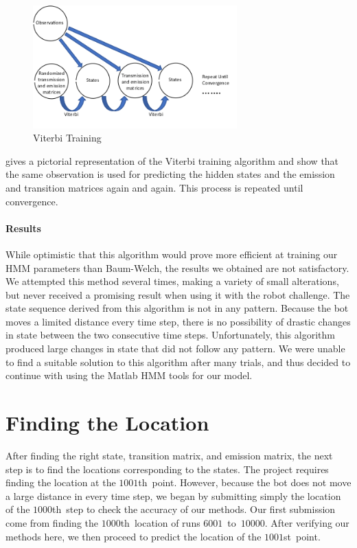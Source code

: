 \documentclass[twoside]{article}
\begin{document}
\begin{figure}[h]
  \centering
  \includegraphics[width=0.7\textwidth]{images/viterbi-training}
  \caption{Viterbi Training}\label{fig:viterbi-training}
\end{figure}

 gives a pictorial representation of the Viterbi training algorithm and show that the same observation is used for predicting the hidden states and the emission and transition matrices again and again.
This process is repeated until convergence.

\paragraph{Results}

While optimistic that this algorithm would prove more efficient at training our HMM parameters than Baum-Welch, the results we obtained are not satisfactory.
We attempted this method several times, making a variety of small alterations, but never received a promising result when using it with the robot challenge.
The state sequence derived from this algorithm is not in any pattern.
Because the bot moves a limited distance every time step, there is no possibility of drastic changes in state between the two consecutive time steps.
Unfortunately, this algorithm produced large changes in state that did not follow any pattern.
We were unable to find a suitable solution to this algorithm after many trials, and thus decided to continue with using the Matlab HMM tools for our model.

\section{Finding the Location}\label{sec:finding-the-locat}

After finding the right state, transition matrix, and emission matrix, the next step is to find the locations corresponding to the states.
The project requires finding the location at the $\num{1001}$th~point.
However, because the bot does not move a large distance in every time step, we began by submitting simply the location of the $\num{1000}$th~step to check the accuracy of our methods.
Our first submission come from finding the $\num{1000}$th~location of runs $\num{6001}$~to~$\num{10000}$.
After verifying our methods here, we then proceed to predict the location of the $\num{1001}$st~point.
\end{document}
